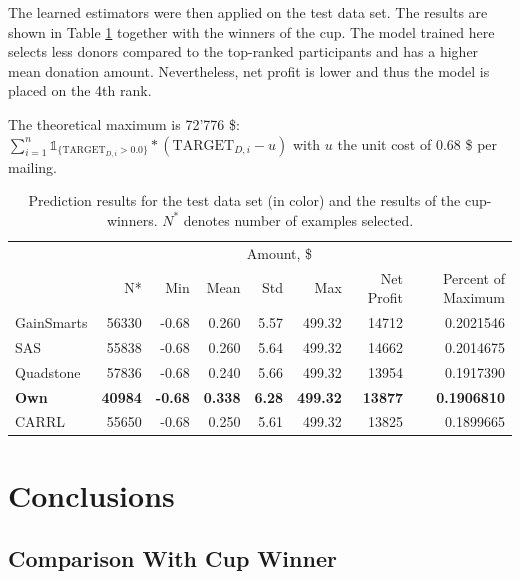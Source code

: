 \documentclass[
  11pt,
  a4paper,
  DIV=12,captions=tableheading,oneside,titlepage]{scrbook}
\begin{document}
The learned estimators were then applied on the test data set. The results are shown in Table \ref{tab:prediction-results} together with the winners of the cup. The model trained here selects less donors compared to the top-ranked participants and has a higher mean donation amount. Nevertheless, net profit is lower and thus the model is placed on the 4th rank.

The theoretical maximum is 72'776 \$: \(\sum_{i=1}^n \mathbb{1}_{\{\text{TARGET}_{D,i} > 0.0\}}*(\text{TARGET}_{D,i} - u)\) with \(u\) the unit cost of 0.68 \$ per mailing.



\begin{table}[!h]

\caption{\label{tab:prediction-results}Prediction results for the test data set (in color) and the results of the cup-winners. \(N^*\) denotes number of examples selected.}
\centering
\begin{tabular}{lrrrrrrr}
\toprule
\multicolumn{1}{c}{ } & \multicolumn{1}{c}{ } & \multicolumn{5}{c}{Amount, \$} & \multicolumn{1}{c}{ } \\
\cmidrule(l{3pt}r{3pt}){3-7}
  & N* & Min & Mean & Std & Max & Net Profit & Percent of Maximum\\
\midrule
GainSmarts & 56330 & -0.68 & 0.260 & 5.57 & 499.32 & 14712 & 0.2021546\\
SAS & 55838 & -0.68 & 0.260 & 5.64 & 499.32 & 14662 & 0.2014675\\
Quadstone & 57836 & -0.68 & 0.240 & 5.66 & 499.32 & 13954 & 0.1917390\\
\textcolor[HTML]{39a8d1}{\textbf{Own}} & \textcolor[HTML]{39a8d1}{\textbf{40984}} & \textcolor[HTML]{39a8d1}{\textbf{-0.68}} & \textcolor[HTML]{39a8d1}{\textbf{0.338}} & \textcolor[HTML]{39a8d1}{\textbf{6.28}} & \textcolor[HTML]{39a8d1}{\textbf{499.32}} & \textcolor[HTML]{39a8d1}{\textbf{13877}} & \textcolor[HTML]{39a8d1}{\textbf{0.1906810}}\\
CARRL & 55650 & -0.68 & 0.250 & 5.61 & 499.32 & 13825 & 0.1899665\\
\bottomrule
\end{tabular}
\end{table}

\hypertarget{conclusions}{%
\chapter{Conclusions}\label{conclusions}}

\hypertarget{comparison-with-cup-winner}{%
\section{Comparison With Cup Winner}\label{comparison-with-cup-winner}}
\end{document}
